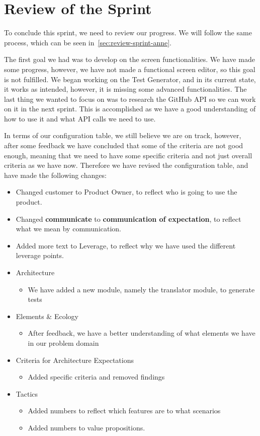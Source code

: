 \section{Review of the Sprint}\label{sec:review-sprint-two}
To conclude this sprint, we need to review our progress.
We will follow the same process, which can be seen in~\autoref{sec:review-sprint-anne}.

The first goal we had was to develop on the screen functionalities.
We have made some progress, however, we have not made a functional screen editor, so this goal is not fulfilled.
We began working on the Test Generator, and in its current state, it works as intended, however, it is missing some advanced functionalities.
The last thing we wanted to focus on was to research the GitHub API so we can work on it in the next sprint.
This is accomplished as we have a good understanding of how to use it and what API calls we need to use.

In terms of our configuration table, we still believe we are on track, however, after some feedback we have concluded that some of the criteria are not good enough, meaning that we need to have some specific criteria and not just overall criteria as we have now.
Therefore we have revised the configuration table, and have made the following changes:

\begin{itemize}
    \item Changed customer to Product Owner, to reflect who is going to use the product.
    \item Changed \textbf{communicate} to \textbf{communication of expectation}, to reflect what we mean by communication.
    \item Added more text to Leverage, to reflect why we have used the different leverage points.
    \item Architecture
        \begin{itemize}
            \item We have added a new module, namely the translator module, to generate tests
        \end{itemize}
    \item Elements \& Ecology
        \begin{itemize}
            \item After feedback, we have a better understanding of what elements we have in our problem domain
        \end{itemize}
    \item Criteria for Architecture Expectations
        \begin{itemize}
            \item Added specific criteria and removed findings
        \end{itemize} 
    \item Tactics
        \begin{itemize}
            \item Added numbers to reflect which features are to what scenarios
            \item Added numbers to value propositions.
        \end{itemize} 
\end{itemize}

